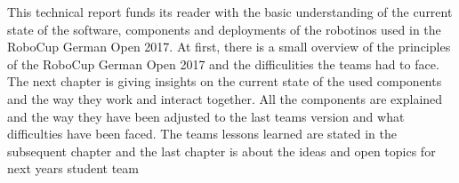 This technical report funds its reader with the basic understanding of the current state of the software, components and deployments of the robotinos used in the RoboCup German Open 2017. At first, there is a small overview of the principles of the RoboCup German Open 2017 and the difficulities the teams had to face. The next chapter is giving insights on the current state of the used components and the way they work and interact together. All the components are explained and the way they have been adjusted to the last teams version and what difficulties have been faced. The teams lessons learned are stated in the subsequent chapter and the last chapter is about the ideas and open topics for next years student team
